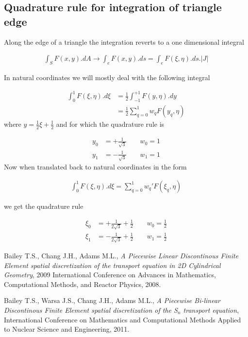 \documentclass[11pt,letterpaper,titlepage]{article}
\newcommand{\beq}{\begin{equation*}
\begin{aligned}}
\newcommand{\eeq}{\end{aligned}
\end{equation*}}
\newcommand{\beqn}{\begin{equation}
	\begin{aligned}}
\newcommand{\eeqn}{\end{aligned}
	\end{equation}}
\begin{document}
\begin{appendices}
\newpage 
{}
\section{Quadrature rule for integration of triangle edge}
Along the edge of a triangle the integration reverts to a one dimensional integral

\beqn 
\int_S F(x,y) .dA \to \int_e F(x,y).ds = \int_{e} F(\xi,\eta).ds.|J| 
\eeqn 

In natural coordinates we will mostly deal with the following integral

\beqn 
\int_{0}^{1} F(\xi,\eta).d\xi &= \frac{1}{2} \int_{-1}^{+1} F(y,\eta).dy \\
&=\frac{1}{2} \sum_{q=0}^{1} w_q F(y_q,\eta)
\eeqn 
where $y=\frac{1}{2} \xi + \frac{1}{2}$ and for which the quadrature rule is 

\beq 
y_0 &=  +\frac{1}{\sqrt{3}} \quad \quad w_0 = 1\\
y_1 &=  -\frac{1}{\sqrt{3}} \quad \quad w_1 = 1
\eeq 
\newline
Now when translated back to natural coordinates in the form

\beq 
\int_{0}^{1} F(\xi,\eta).d\xi = \sum_{q=0}^1 w_q' F(\xi_q,\eta)
\eeq 

we get the quadrature rule

\beq 
\xi_0 &=  +\frac{1}{2\sqrt{3}} +\frac{1}{2}\quad \quad w_0 =\frac{1}{2}\\
\xi_1 &=  -\frac{1}{2\sqrt{3}}+\frac{1}{2} \quad \quad w_1 = \frac{1}{2}
\eeq 

\end{appendices}

\newpage
{}
\begin{thebibliography}{1}
    
      Bailey T.S., Chang J.H., Adams M.L., {\em A Piecewise Linear Discontinous Finite Element spatial discretization of the transport equation in 2D Cylindrical Geometry}, 2009 International Conference on Advances in Mathematics, Computational Methods, and Reactor Physics, 2008.
    
       Bailey T.S., Warsa J.S., Chang J.H., Adams M.L., {\em A Piecewise Bi-linear Discontinous Finite Element spatial discretization of the S$_n$ transport equation}, International Conference on Mathematics and Computational Methods Applied to Nuclear Science and Engineering, 2011.
    
\end{thebibliography}
\end{document}
